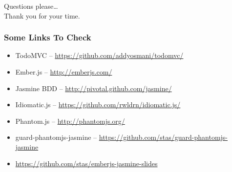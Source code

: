 \documentclass[compress]{beamer}
\begin{document}
\begin{frame}
  \begin{center}
  \huge Questions please\ldots
  \\
  Thank you for your time.
  \end{center}
\end{frame}

\begin{frame}
\frametitle{Some Links To Check}

\begin{itemize}
  \item TodoMVC -- \url{https://github.com/addyosmani/todomvc/}
  \item Ember.js -- \url{http://emberjs.com/}
  \item Jasmine BDD -- \url{http://pivotal.github.com/jasmine/}
  \item Idiomatic.js -- \url{https://github.com/rwldrn/idiomatic.js/}
  \item Phantom.js -- \url{http://phantomjs.org/}
  \item guard-phantomjs-jasmine -- \url{https://github.com/stas/guard-phantomjs-jasmine}
  \item \url{https://github.com/stas/emberjs-jasmine-slides}
\end{itemize}

\end{frame}
\end{document}
